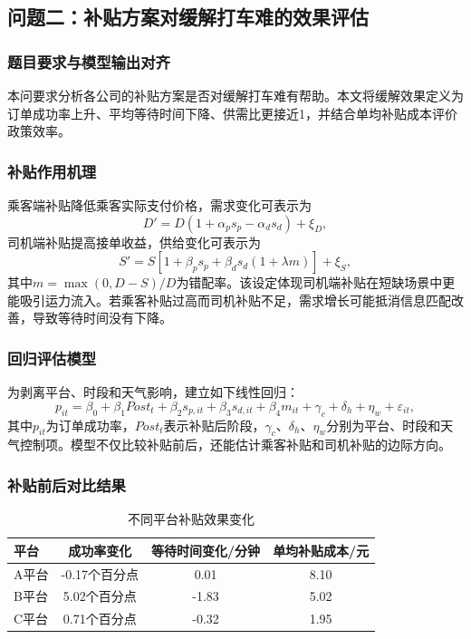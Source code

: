 \documentclass[12pt,a4paper]{ctexart}
\begin{document}
\subsection{问题二：补贴方案对缓解打车难的效果评估}
\subsubsection{题目要求与模型输出对齐}
本问要求分析各公司的补贴方案是否对缓解打车难有帮助。本文将缓解效果定义为订单成功率上升、平均等待时间下降、供需比更接近1，并结合单均补贴成本评价政策效率。

\subsubsection{补贴作用机理}
乘客端补贴降低乘客实际支付价格，需求变化可表示为
\begin{equation}
D'=D(1+\alpha_p s_p-\alpha_d s_d)+\xi_D,
\end{equation}
司机端补贴提高接单收益，供给变化可表示为
\begin{equation}
S'=S\left[1+\beta_p s_p+\beta_d s_d(1+\lambda m)\right]+\xi_S,
\end{equation}
其中$m=\max(0,D-S)/D$为错配率。该设定体现司机端补贴在短缺场景中更能吸引运力流入。若乘客补贴过高而司机补贴不足，需求增长可能抵消信息匹配改善，导致等待时间没有下降。

\subsubsection{回归评估模型}
为剥离平台、时段和天气影响，建立如下线性回归：
\begin{equation}
 p_{it}=\beta_0+\beta_1 Post_t+\beta_2 s_{p,it}+\beta_3 s_{d,it}+\beta_4 m_{it}+\gamma_c+\delta_h+\eta_w+\varepsilon_{it},
\end{equation}
其中$p_{it}$为订单成功率，$Post_t$表示补贴后阶段，$\gamma_c$、$\delta_h$、$\eta_w$分别为平台、时段和天气控制项。模型不仅比较补贴前后，还能估计乘客补贴和司机补贴的边际方向。

\subsubsection{补贴前后对比结果}
\begin{table}[H]
\centering
\caption{不同平台补贴效果变化}
\label{tab:q2delta}
\begin{tabular}{lccc}
\toprule
平台 & 成功率变化 & 等待时间变化/分钟 & 单均补贴成本/元\\
\midrule
A平台 & -0.17个百分点 & 0.01 & 8.10\\
B平台 & 5.02个百分点 & -1.83 & 5.02\\
C平台 & 0.71个百分点 & -0.32 & 1.95\\
\bottomrule
\end{tabular}
\end{table}
\end{document}
